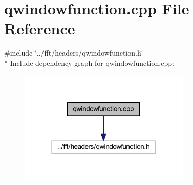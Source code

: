 \hypertarget{a00127}{\section{qwindowfunction.\+cpp File Reference}
\label{a00127}
}
{\ttfamily \#include \char`\"{}../fft/headers/qwindowfunction.\+h\char`\"{}}\\*
Include dependency graph for qwindowfunction.\+cpp\+:
\nopagebreak
\begin{figure}[H]
\begin{center}
\leavevmode
\includegraphics[width=232pt]{d4/dce/a00337}
\end{center}
\end{figure}
